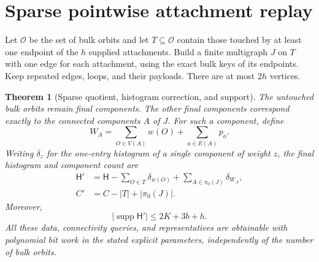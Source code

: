 \documentclass[11pt]{article}
\newtheorem{theorem}{Theorem}[section]
\theoremstyle{definition}
\newcommand{\supp}{\operatorname{supp}}
\newcommand{\hist}{\mathsf H}
\newcommand{\orb}{\mathcal O}
\begin{document}
\section{Sparse pointwise attachment replay}
\label{sec:sparse}

Let $\orb$ be the set of bulk orbits and let $T\subseteq\orb$ contain those touched by at least one endpoint of the $h$ supplied attachments. Build a finite multigraph $J$ on $T$ with one edge for each attachment, using the exact bulk keys of its endpoints. Keep repeated edges, loops, and their payloads. There are at most $2h$ vertices.

\begin{theorem}[Sparse quotient, histogram correction, and support]
\label{thm:sparse}
The untouched bulk orbits remain final components. The other final components correspond exactly to the connected components $A$ of $J$. For such a component, define
\begin{equation}
 W_A=\sum_{O\in V(A)}w(O)+\sum_{a\in E(A)}p_a.
 \label{eq:clusterweight}
\end{equation}
Writing $\delta_z$ for the one-entry histogram of a single component of weight $z$, the final histogram and component count are
\begin{align}
 \hist'&=\hist-\sum_{O\in T}\delta_{w(O)}+\sum_{A\in\pi_0(J)}\delta_{W_A},
 \label{eq:histcorrection}\\
 C'&=C-|T|+|\pi_0(J)|.
 \label{eq:countcorrection}
\end{align}
Moreover,
\begin{equation}
 |\supp\hist'|\le2K+3b+h.
 \label{eq:finalsupport}
\end{equation}
All these data, connectivity queries, and representatives are obtainable with polynomial bit work in the stated explicit parameters, independently of the number of bulk orbits.
\end{theorem}
\end{document}
